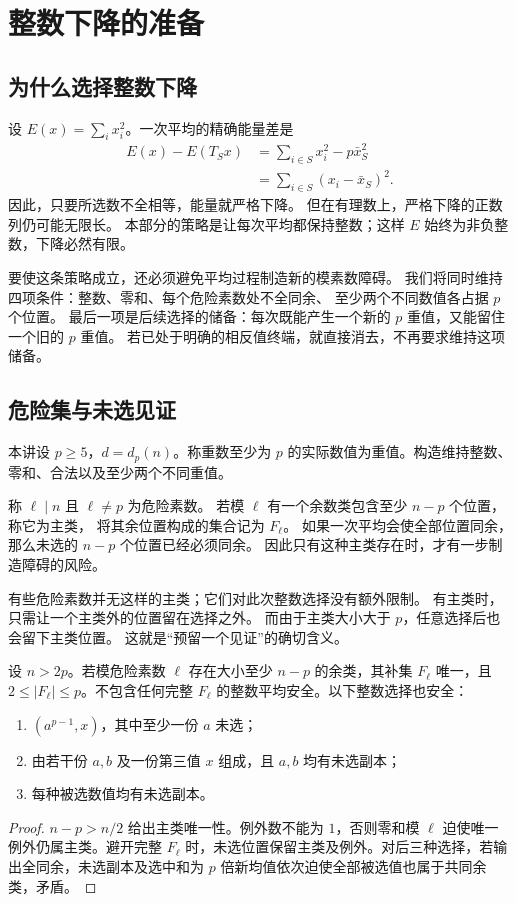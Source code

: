 \chapter{整数下降的准备}\label{sec:descent}

\section{为什么选择整数下降}
设 $E(x)=\sum_i x_i^2$。一次平均的精确能量差是
\begin{align*}
E(x)-E(T_Sx)
 &=\sum_{i\in S}x_i^2-p\bar x_S^2\\
 &=\sum_{i\in S}(x_i-\bar x_S)^2.
\end{align*}
因此，只要所选数不全相等，能量就严格下降。
但在有理数上，严格下降的正数列仍可能无限长。
本部分的策略是让每次平均都保持整数；这样 $E$ 始终为非负整数，下降必然有限。

要使这条策略成立，还必须避免平均过程制造新的模素数障碍。
我们将同时维持四项条件：整数、零和、每个危险素数处不全同余、
至少两个不同数值各占据 $p$ 个位置。
最后一项是后续选择的储备：每次既能产生一个新的 $p$ 重值，又能留住一个旧的 $p$ 重值。
若已处于明确的相反值终端，就直接消去，不再要求维持这项储备。

\section{危险集与未选见证}

本讲设 $p\ge5$，$d=d_p(n)$。称重数至少为 $p$ 的实际数值为重值。构造维持整数、零和、合法以及至少两个不同重值。


\begin{definition}[危险素数与危险集]
称 $\ell\mid n$ 且 $\ell\ne p$ 为危险素数。
若模 $\ell$ 有一个余数类包含至少 $n-p$ 个位置，称它为主类，
将其余位置构成的集合记为 $F_\ell$。
如果一次平均会使全部位置同余，那么未选的 $n-p$ 个位置已经必须同余。
因此只有这种主类存在时，才有一步制造障碍的风险。
\end{definition}
有些危险素数并无这样的主类；它们对此次整数选择没有额外限制。
有主类时，只需让一个主类外的位置留在选择之外。
而由于主类大小大于 $p$，任意选择后也会留下主类位置。
这就是“预留一个见证”的确切含义。

\begin{lemma}[由未选位置保证安全]\label{lem:safety}
设 $n>2p$。若模危险素数 $\ell$ 存在大小至少 $n-p$ 的余类，其补集 $F_\ell$ 唯一，且 $2\le|F_\ell|\le p$。不包含任何完整 $F_\ell$ 的整数平均安全。以下整数选择也安全：
\begin{enumerate}
\item $(a^{p-1},x)$，其中至少一份 $a$ 未选；
\item 由若干份 $a,b$ 及一份第三值 $x$ 组成，且 $a,b$ 均有未选副本；
\item 每种被选数值均有未选副本。
\end{enumerate}
\end{lemma}
\begin{proof}
$n-p>n/2$ 给出主类唯一性。例外数不能为 $1$，否则零和模 $\ell$ 迫使唯一例外仍属主类。避开完整 $F_\ell$ 时，未选位置保留主类及例外。对后三种选择，若输出全同余，未选副本及选中和为 $p$ 倍新均值依次迫使全部被选值也属于共同余类，矛盾。
\end{proof}


